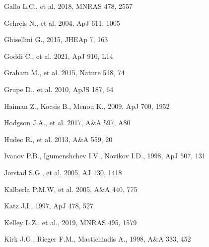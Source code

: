 \documentclass[preprints,article,accept,moreauthors,pdftex]{Definitions/mdpi}
\begin{document}
\begin{thebibliography}{999}
Gallo L.C., et al. 2018, MNRAS 478, 2557

Gehrels N., et al. 2004, ApJ 611, 1005

Ghisellini G., 2015, JHEAp 7, 163

Goddi C., et al. 2021, ApJ 910, L14 

Graham M., et al. 2015, Nature 518, 74

Grupe D., et al. 2010, ApJS 187, 64




Haiman Z., Kocsis B., Menou K., 2009, ApJ 700, 1952 

Hodgson J.A., et al. 2017, A\&A 597, A80

Hudec R., et al. 2013, A\&A 559, 20

Ivanov P.B., Igumenshchev I.V., Novikov I.D., 1998, ApJ 507, 131

Jorstad S.G., et al. 2005, AJ 130, 1418

Kalberla P.M.W, et al. 2005, A\&A 440, 775

Katz J.I., 1997, ApJ 478, 527

Kelley L.Z., et al., 2019, MNRAS 495, 1579


Kirk J.G., Rieger F.M., Mastichiadis A., 1998, A\&A 333, 452  


\end{thebibliography}
\end{document}
